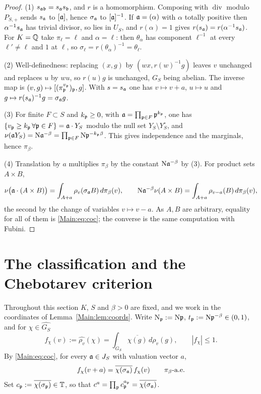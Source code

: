 \begin{proof}
(1) $s_{\mathfrak{a}\mathfrak{b}}=s_{\mathfrak{a}} s_{\mathfrak{b}}$, and $r$ is a homomorphism. Composing with
$\operatorname{div}$ modulo $P_{S,+}$ sends $s_{\mathfrak{a}}$ to $[\mathfrak{a}]$, hence $\sigma_{\mathfrak{a}}$ to
$[\mathfrak{a}]^{-1}$. If $\mathfrak{a}=(\alpha)$ with $\alpha$ totally positive then $\alpha^{-1}s_{\mathfrak{a}}$ has
trivial divisor, so lies in $U_S$, and $r(\alpha)=1$ gives
$r(s_{\mathfrak{a}})=r(\alpha^{-1}s_{\mathfrak{a}})$. For $K=\mathbb{Q}$ take $\pi_\ell=\ell$ and $\alpha=\ell$: then
$\theta_\alpha$ has component $\ell^{-1}$ at every $\ell'\neq\ell$ and $1$ at $\ell$, so
$\sigma_\ell=r(\theta_\alpha)^{-1}=\theta_\ell$.

(2) Well-definedness: replacing $(x,g)$ by $(wx,r(w)^{-1}g)$ leaves $v$
unchanged and replaces $u$ by $wu$, so $r(u)g$ is unchanged, $G_S$ being
abelian. The inverse map is $(v,g)\mapsto[(\pi_{\mathfrak{p}}^{v_{\mathfrak{p}}})_{\mathfrak{p}},g]$. With
$s=s_{\mathfrak{a}}$ one has $v\mapsto v+a$, $u\mapsto u$ and
$g\mapsto r(s_{\mathfrak{a}})^{-1}g=\sigma_{\mathfrak{a}} g$.

(3) For finite $F\subset S$ and $k_{\mathfrak{p}}\ge0$, with $\mathfrak{a}=\prod_{\mathfrak{p}\in F}\mathfrak{p}^{k_{\mathfrak{p}}}$,
one has $\{v_{\mathfrak{p}}\ge k_{\mathfrak{p}}\,\forall\mathfrak{p}\in F\}=\mathfrak{a}\cdot Y_S$ modulo the null set
$Y_S\setminus Y_S^\circ$, and $\nu(\mathfrak{a} Y_S)=\mathrm{N}\mathfrak{a}^{-\beta}=\prod_{\mathfrak{p}\in F}\mathrm{N}\mathfrak{p}^{-k_{\mathfrak{p}}\beta}$.
This gives independence and the marginals, hence $\pi_\beta$.

(4) Translation by $a$ multiplies $\pi_\beta$ by the constant $\mathrm{N}\mathfrak{a}^{-\beta}$
by (3). For product sets $A\times B$,
\[
\nu\bigl(\mathfrak{a}\cdot(A\times B)\bigr)=\int_{A+a}\rho_v(\sigma_{\mathfrak{a}} B)\,d\pi_\beta(v),
\qquad
\mathrm{N}\mathfrak{a}^{-\beta}\nu(A\times B)=\int_{A+a}\rho_{v-a}(B)\,d\pi_\beta(v),
\]
the second by the change of variables $v\mapsto v-a$. As $A,B$ are arbitrary,
equality for all of them is \eqref{Main:eq:coc}; the converse is the same
computation with Fubini.
\end{proof}
\section{The classification and the Chebotarev criterion}\label{Main:sec:crit}

Throughout this section $K$, $S$ and $\beta>0$ are fixed, and we work in the
coordinates of Lemma~\ref{Main:lem:coords}. Write $\mathrm{N}_{\mathfrak{p}}:=\mathrm{N}\mathfrak{p}$,
$t_{\mathfrak{p}}:=\mathrm{N}\mathfrak{p}^{-\beta}\in(0,1)$, and for $\chi\in\widehat{G_S}$
\[
f_\chi(v):=\widehat{\rho_v}(\chi)=\int_{G_S}\overline{\chi(g)}\,d\rho_v(g),\qquad|f_\chi|\le1 .
\]
By \eqref{Main:eq:coc}, for every $\mathfrak{a}\in J_S$ with valuation vector $a$,
\begin{equation}\label{Main:eq:fchi}
f_\chi(v+a)=\overline{\chi(\sigma_{\mathfrak{a}})}\,f_\chi(v)\qquad\pi_\beta\text{-a.e.}
\end{equation}
Set $c_{\mathfrak{p}}:=\overline{\chi(\sigma_{\mathfrak{p}})}\in\mathbb{T}$, so that $c^a=\prod_{\mathfrak{p}} c_{\mathfrak{p}}^{a_{\mathfrak{p}}}=\overline{\chi(\sigma_{\mathfrak{a}})}$.

